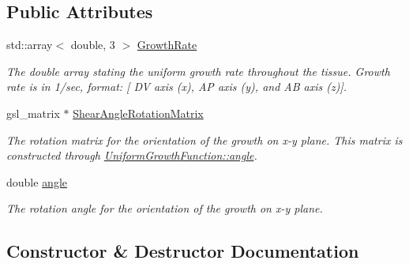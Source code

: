 \subsection*{Public Attributes}
\begin{DoxyCompactItemize}
\item 
\hypertarget{classUniformGrowthFunction_a2dd690c963e646ea55fc9359b54d5e5e}{}std\+::array$<$ double, 3 $>$ \hyperlink{classUniformGrowthFunction_a2dd690c963e646ea55fc9359b54d5e5e}{Growth\+Rate}\label{classUniformGrowthFunction_a2dd690c963e646ea55fc9359b54d5e5e}

\begin{DoxyCompactList}\small\item\em The double array stating the uniform growth rate throughout the tissue. Growth rate is in 1/sec, format\+: \mbox{[} D\+V axis (x), A\+P axis (y), and A\+B axis (z)\mbox{]}. \end{DoxyCompactList}\item 
\hypertarget{classUniformGrowthFunction_afef9ac84dfe60bbf3d558fbb31946087}{}gsl\+\_\+matrix $\ast$ \hyperlink{classUniformGrowthFunction_afef9ac84dfe60bbf3d558fbb31946087}{Shear\+Angle\+Rotation\+Matrix}\label{classUniformGrowthFunction_afef9ac84dfe60bbf3d558fbb31946087}

\begin{DoxyCompactList}\small\item\em The rotation matrix for the orientation of the growth on x-\/y plane. This matrix is constructed through \hyperlink{classUniformGrowthFunction_a1a985ff52f9796688e00942b4d3349f8}{Uniform\+Growth\+Function\+::angle}. \end{DoxyCompactList}\item 
\hypertarget{classUniformGrowthFunction_a1a985ff52f9796688e00942b4d3349f8}{}double \hyperlink{classUniformGrowthFunction_a1a985ff52f9796688e00942b4d3349f8}{angle}\label{classUniformGrowthFunction_a1a985ff52f9796688e00942b4d3349f8}

\begin{DoxyCompactList}\small\item\em The rotation angle for the orientation of the growth on x-\/y plane. \end{DoxyCompactList}\end{DoxyCompactItemize}


\subsection{Constructor \& Destructor Documentation}
\hypertarget{classUniformGrowthFunction_a9ea553c72b2d5e83e98e4ec7a8c025b6}{}
